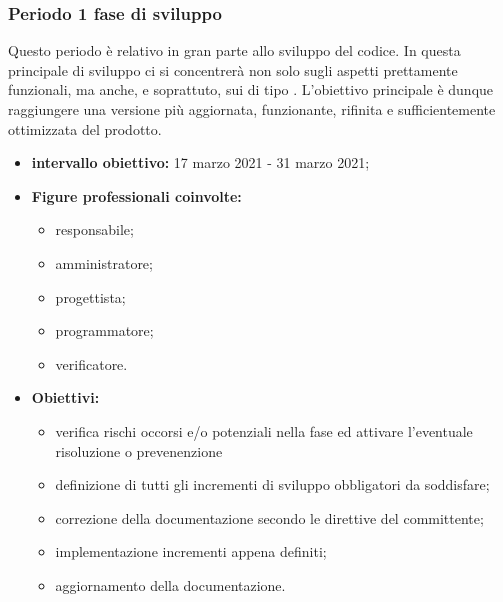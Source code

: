 

        \subsubsection{Periodo 1 fase di sviluppo}
        Questo periodo è relativo in gran parte allo sviluppo del codice. In questa  principale di sviluppo ci si concentrerà non solo sugli aspetti prettamente funzionali, ma anche, e soprattuto, sui  di tipo . L'obiettivo principale è dunque raggiungere una versione più aggiornata, funzionante, rifinita e sufficientemente ottimizzata del prodotto.
        \begin{itemize}
                \item \textbf{intervallo obiettivo: } 17 marzo 2021 - 31 marzo 2021;
                \item  \textbf{Figure professionali coinvolte:}
                \begin{itemize}
                    \item responsabile;
                    \item amministratore;
                    \item progettista;
                    \item programmatore;
                    \item verificatore.
                \end{itemize}
                \item \textbf{Obiettivi:}
                \begin{itemize}
                    \item verifica rischi occorsi e/o potenziali nella fase ed attivare l'eventuale risoluzione o prevenenzione
                    \item definizione di tutti gli incrementi di sviluppo obbligatori da soddisfare;
                    \item correzione della documentazione secondo le direttive del committente;
                    \item implementazione incrementi appena definiti;
                    \item aggiornamento della documentazione.
                \end{itemize}
        \end{itemize}

